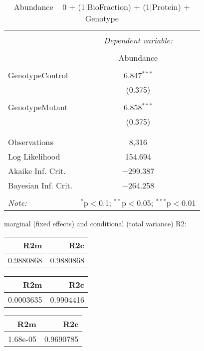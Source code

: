 \documentclass[11pt]{report}
\begin{document}
\begin{table}[!htbp] \centering 
  \caption{Abundance ~ 0 + (1|BioFraction) + (1|Protein) + Genotype} 
  \label{} 
\begin{tabular}{@{\extracolsep{5pt}}lc} 
\\[-1.8ex]\hline 
\hline \\[-1.8ex] 
 & \multicolumn{1}{c}{\textit{Dependent variable:}} \\ 
\cline{2-2} 
\\[-1.8ex] & Abundance \\ 
\hline \\[-1.8ex] 
 GenotypeControl & 6.847$^{***}$ \\ 
  & (0.375) \\ 
  & \\ 
 GenotypeMutant & 6.858$^{***}$ \\ 
  & (0.375) \\ 
  & \\ 
\hline \\[-1.8ex] 
Observations & 8,316 \\ 
Log Likelihood & 154.694 \\ 
Akaike Inf. Crit. & $-$299.387 \\ 
Bayesian Inf. Crit. & $-$264.258 \\ 
\hline 
\hline \\[-1.8ex] 
\textit{Note:}  & \multicolumn{1}{r}{$^{*}$p$<$0.1; $^{**}$p$<$0.05; $^{***}$p$<$0.01} \\ 
\end{tabular} 
\end{table} 
marginal (fixed effects) and conditional (total variance) R2:

\begin{tabular}{r|r}
\hline
R2m & R2c\\
\hline
0.9880868 & 0.9880868\\
\hline
\end{tabular}

\begin{tabular}{r|r}
\hline
R2m & R2c\\
\hline
0.0003635 & 0.9904416\\
\hline
\end{tabular}

\begin{tabular}{r|r}
\hline
R2m & R2c\\
\hline
1.68e-05 & 0.9690785\\
\hline
\end{tabular}
\end{document}

